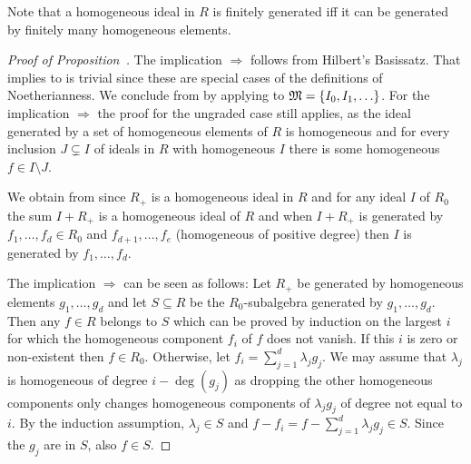 \documentclass[a4paper,parskip=half,numbers=enddot, DIV=12, headheight=30pt]{scrreprt}
\begin{document}
\begin{rem}
    Note that a homogeneous ideal in $R$ is finitely generated iff it can be generated by finitely many homogeneous elements.
\end{rem}
\begin{proof}[Proof of Proposition~]
    The implication  $\Rightarrow$  follows from Hilbert's Basissatz. That  implies  to  is trivial since these are special cases of the definitions of Noetherianness. We conclude  from  by applying  to $\mathfrak{M}=\{I_0,I_1,\ldots\}$. For the implication  $\Rightarrow$  the proof for the ungraded case still applies, as the ideal generated by a set of homogeneous elements of $R$ is homogeneous and for every inclusion $J\subsetneq I$ of ideals in $R$ with homogeneous $I$ there is some homogeneous $f\in I\setminus J$.
    
    We obtain  from  since $R_+$ is a homogeneous ideal in $R$ and for any ideal $I$ of $R_0$ the sum $I+R_+$ is a homogeneous ideal of $R$ and when $I+R_+$ is generated by $f_1,\ldots, f_d\in R_0$ and $f_{d+1},\ldots,f_e$ (homogeneous of positive degree) then $I$ is generated by $f_1,\ldots, f_d$.
    
    The implication  $\Rightarrow$  can be seen as follows: Let $R_+$ be generated by homogeneous elements $g_1,\ldots, g_d$ and let $S\subseteq R$ be the $R_0$-subalgebra generated by $g_1,\ldots, g_d$. Then any $f\in R$ belongs to $S$ which can be proved by induction on the largest $i$ for which the homogeneous component $f_i$ of $f$ does not vanish. If this $i$ is zero or non-existent then $f\in R_0$. Otherwise, let $f_i = \sum_{j=1}^d \lambda_jg_j$. We may assume that $\lambda_j$ is homogeneous of degree $i-\deg(g_j)$ as dropping the other homogeneous components only changes homogeneous components of $\lambda_j g_j$ of degree not equal to $i$. By the induction assumption, $\lambda_j\in S$ and $f-f_i = f-\sum_{j=1}^d\lambda_j g_j\in S$. Since the $g_j$ are in $S$, also $f\in S$.
\end{proof}
\end{document}
